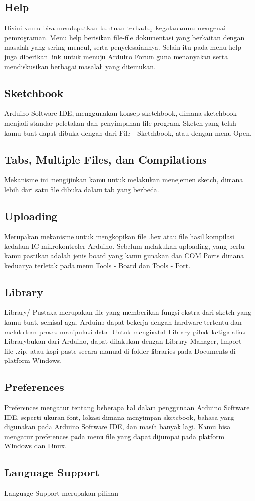 \subsection{Help}
Disini kamu bisa mendapatkan bantuan terhadap kegalauanmu mengenai pemrograman. Menu help berisikan file-file dokumentasi yang berkaitan dengan masalah yang sering muncul, serta penyelesaiannya. Selain itu pada menu help juga diberikan link untuk menuju Arduino Forum guna menanyakan serta mendiskusikan berbagai masalah yang ditemukan.

\subsection{Sketchbook}
Arduino Software IDE, menggunakan konsep sketchbook, dimana sketchbook menjadi standar peletakan dan penyimpanan file program. Sketch yang telah kamu buat dapat dibuka dengan dari File - Sketchbook, atau dengan menu Open.

\subsection{Tabs, Multiple Files, dan Compilations}
Mekanisme ini mengijinkan kamu untuk melakukan menejemen sketch, dimana lebih dari satu file dibuka dalam tab yang berbeda.

\subsection{Uploading}
Merupakan mekanisme untuk mengkopikan file .hex atau file hasil kompilasi kedalam IC mikrokontroler Arduino. Sebelum melakukan uploading, yang perlu kamu pastikan adalah jenis board yang kamu gunakan dan COM Ports dimana keduanya terletak pada menu Tools - Board dan Tools - Port.

\subsection{Library}
Library/ Pustaka merupakan file yang memberikan fungsi ekstra dari sketch yang kamu buat, semisal agar Arduino dapat bekerja dengan hardware tertentu dan melakukan proses manipulasi data. Untuk menginstal Library pihak ketiga alias Librarybukan dari Arduino, dapat dilakukan dengan Library Manager, Import file .zip, atau kopi paste secara manual di folder libraries pada Documents di platform Windows.




\subsection{Preferences}
Preferences mengatur tentang beberapa hal dalam penggunaan Arduino Software IDE, seperti ukuran font, lokasi dimana menyimpan sketcbook, bahasa yang digunakan pada Arduino Software IDE, dan masih banyak lagi. Kamu bisa mengatur preferences pada menu file yang dapat dijumpai pada platform Windows dan Linux.
\subsection{Language Support}

Language Support merupakan pilihan